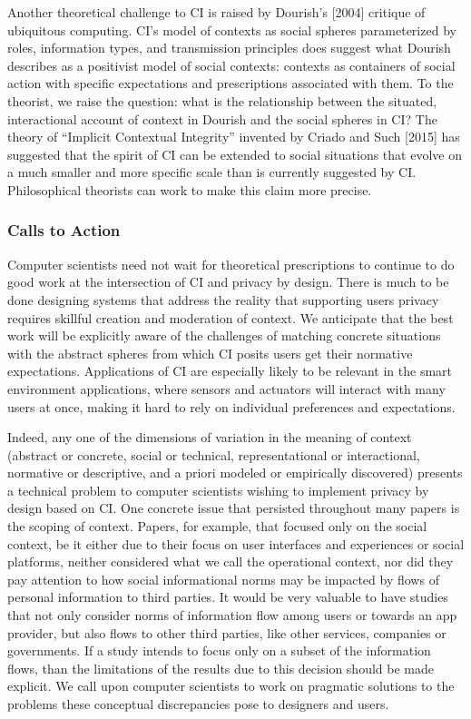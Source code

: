 \documentclass[../thesis.tex]{subfiles}
\begin{document}
Another theoretical challenge to CI is raised by
Dourish's [2004] critique of ubiquitous computing.
CI's model of contexts as social spheres parameterized
by roles, information types, and transmission principles does suggest
what Dourish describes as a positivist model of social contexts:
contexts as containers of social action with specific expectations and
prescriptions associated with them. To the theorist, we raise the
question: what is the relationship between the situated, interactional
account of context in Dourish and the social spheres in CI? The theory
of ``Implicit Contextual Integrity''
invented by Criado and Such [2015] has suggested that the spirit of CI
can be extended to social situations that evolve on a much smaller and
more specific scale than is currently suggested by CI. Philosophical
theorists can work to make this claim more precise.

\subsubsection{Calls to Action}
\label{CI5.2.2}

Computer scientists need not wait for theoretical prescriptions to
continue to do good work at the intersection of CI and privacy by
design. There is much to be done designing systems that address the
reality that supporting users privacy requires skillful creation and
moderation of context. We anticipate that the best work will be
explicitly aware of the challenges of matching concrete situations with
the abstract spheres from which CI posits users get their normative
expectations. Applications of CI are especially likely to be relevant
in the smart environment applications, where sensors and actuators will
interact with many users at once, making it hard to rely on individual
preferences and expectations. 

Indeed, any one of the dimensions of variation in the meaning of context
(abstract or concrete, social or technical, representational or
interactional, normative or descriptive, and a priori modeled or
empirically discovered) presents a technical problem to computer
scientists wishing to implement privacy by design based on CI. One
concrete issue that persisted throughout many papers is the scoping of
context. Papers, for example, that focused only on the social context,
be it either due to their focus on user interfaces and experiences or
social platforms, neither considered what we call the operational
context, nor did they pay attention to how social informational norms
may be impacted by flows of personal information to third parties. It
would be very valuable to have studies that not only consider norms of
information flow among users or towards an app provider, but also flows
to other third parties, like other services, companies or governments.
If a study intends to focus only on a subset of the information flows,
than the limitations of the results due to this decision should be made
explicit. We call upon computer scientists to work on pragmatic
solutions to the problems these conceptual discrepancies pose to
designers and users.
\end{document}
